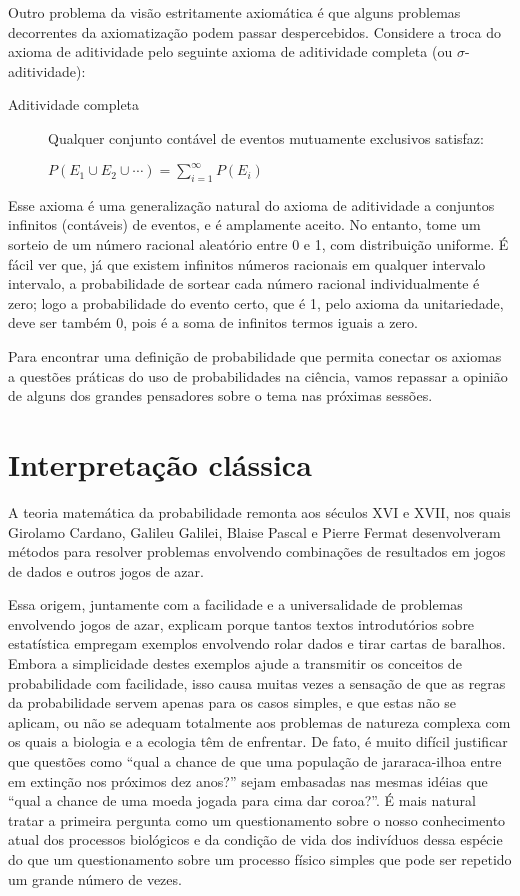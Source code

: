 Outro problema da visão estritamente axiomática é que alguns problemas decorrentes da axiomatização podem passar despercebidos. 
Considere a troca do axioma
de aditividade pelo seguinte axioma de aditividade completa (ou $\sigma$-aditividade):

\begin{description}
	\item[Aditividade completa] Qualquer conjunto contável de eventos mutuamente exclusivos satisfaz:

		$P(E_1 \cup E_2 \cup \cdots) = \sum_{i=1}^\infty P(E_i)$
\end{description}

Esse axioma é uma generalização natural do axioma de aditividade a conjuntos infinitos (contáveis) de eventos, e é amplamente
aceito. No entanto, tome um sorteio de um número racional aleatório entre 0 e 1, com distribuição uniforme. É fácil ver que,
já que existem infinitos números racionais em qualquer intervalo intervalo,
a probabilidade de sortear cada número racional individualmente é zero; logo a probabilidade do evento certo, que é 1, 
pelo axioma da unitariedade, deve ser também 0, pois é a soma de infinitos termos iguais a zero.

Para encontrar uma definição de probabilidade que permita conectar os axiomas a questões práticas do uso de probabilidades na
ciência, vamos repassar a opinião de alguns dos grandes pensadores sobre o tema nas próximas sessões.

\section{Interpretação clássica}
A teoria matemática da probabilidade remonta aos séculos XVI e XVII, nos quais Girolamo Cardano, Galileu Galilei, Blaise Pascal
e Pierre Fermat desenvolveram métodos para resolver problemas envolvendo combinações de resultados em jogos de dados e outros
jogos de azar. 

Essa origem, juntamente com a facilidade e a universalidade de problemas envolvendo jogos de azar, explicam porque tantos textos
introdutórios sobre estatística empregam exemplos envolvendo rolar dados e tirar cartas de baralhos. Embora a simplicidade
destes exemplos ajude a transmitir os conceitos de probabilidade com facilidade, isso causa muitas vezes a sensação de que
as regras da probabilidade servem apenas para os casos simples, e que estas não se aplicam, ou não se adequam totalmente aos 
problemas de natureza complexa com os quais a biologia e a ecologia têm de enfrentar. De fato, é muito difícil justificar que
questões como ``qual a chance de que uma população de jararaca-ilhoa entre em extinção nos próximos dez anos?'' sejam embasadas
nas mesmas idéias que ``qual a chance de uma moeda jogada para cima dar coroa?''. É mais natural tratar a primeira pergunta como
um questionamento sobre o nosso conhecimento atual dos processos biológicos e da condição de vida dos indivíduos dessa espécie
do que um questionamento sobre um processo físico simples que pode ser repetido um grande número de vezes. 

